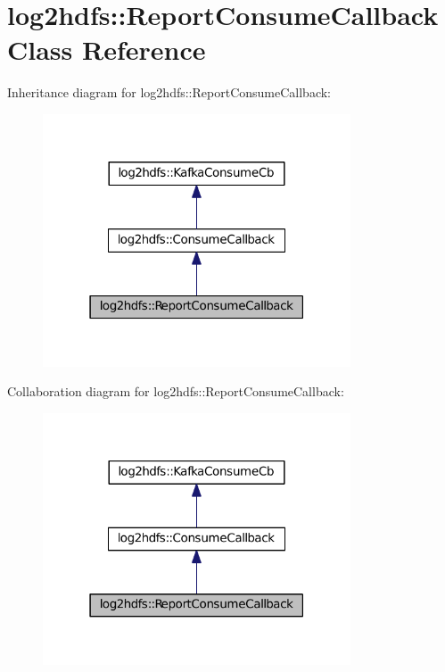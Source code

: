\hypertarget{classlog2hdfs_1_1ReportConsumeCallback}{}\section{log2hdfs\+:\+:Report\+Consume\+Callback Class Reference}
\label{classlog2hdfs_1_1ReportConsumeCallback}


Inheritance diagram for log2hdfs\+:\+:Report\+Consume\+Callback\+:
\nopagebreak
\begin{figure}[H]
\begin{center}
\leavevmode
\includegraphics[width=259pt]{classlog2hdfs_1_1ReportConsumeCallback__inherit__graph}
\end{center}
\end{figure}


Collaboration diagram for log2hdfs\+:\+:Report\+Consume\+Callback\+:
\nopagebreak
\begin{figure}[H]
\begin{center}
\leavevmode
\includegraphics[width=259pt]{classlog2hdfs_1_1ReportConsumeCallback__coll__graph}
\end{center}
\end{figure}
